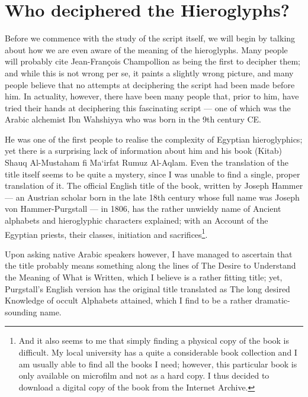 \chapter*{Who deciphered the Hieroglyphs?}
  Before we commence with the study of the script itself, we will begin by talking about how we are even aware of the meaning of the hieroglyphs. Many people will probably cite Jean-François Champollion as being the first to decipher them; and while this is not wrong per se, it paints a slightly wrong picture, and many people believe that no attempts at deciphering the script had been made before him. In actuality, however, there have been many people that, prior to him, have tried their hands at deciphering this fascinating script — one of which was the Arabic alchemist Ibn Wahshiyya who was born in the 9th century CE.

	He was one of the first people to realise the complexity of Egyptian hieroglyphics; yet there is a surprising lack of information about him and his book (Kitab) Shauq Al-Mustaham fi Ma‘irfat Rumuz Al-Aqlam. Even the translation of the title itself seems to be quite a mystery, since I was unable to find a single, proper translation of it. The official English title of the book, written by Joseph Hammer — an Austrian scholar born in the late 18th century whose full name was Joseph von Hammer-Purgstall — in 1806, has the rather unwieldy name of Ancient alphabets and hieroglyphic characters explained; with an Account of the Egyptian priests, their classes, initiation and sacrifices\footnote{And it also seems to me that simply finding a physical copy of the book is difficult. My local university has a quite a considerable book collection and I am usually able to find all the books I need; however, this particular book is only available on microfilm and not as a hard copy. I thus decided to download a digital copy of the book from the Internet Archive.}.

	Upon asking native Arabic speakers however, I have managed to ascertain that the title probably means something along the lines of The Desire to Understand the Meaning of What is Written, which I believe is a rather fitting title; yet, Purgstall’s English version has the original title translated as The long desired Knowledge of occult Alphabets attained, which I find to be a rather dramatic-sounding name. 


